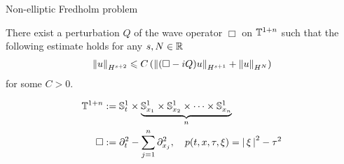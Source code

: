 \documentclass{beamer}
\begin{document}
\begin{frame}{Non-elliptic Fredholm problem}
\begin{theorem} 
    There exist a perturbation $Q$ of the wave operator $\Box$ on $\T^{1 + n}$ such that the following estimate holds for any $s, N \in \R$
    \begin{align*}
    \norm[u]_{H^{s + 2}} \leq C\brac{\norm[(\Box - iQ)u]_{H^{s + 1}} + \norm[u]_{H^N}}
    \end{align*}
    for some $C > 0$. 
\end{theorem}
\begin{align*}
\T^{1 + n} &:= \S^1_t \times  \underbrace{\S^1_{x_1} \times \S^1_{x_2} \times \dots \times \S^1_{x_n}}_{n} \\
\Box &:= \p_t^2 - \sum_{j = 1}^{n} \p_{x_j}^2, \quad p(t, x, \tau, \xi) = \abs{\xi}^2 - \tau^2
\end{align*}
\end{frame} 
\end{document}
